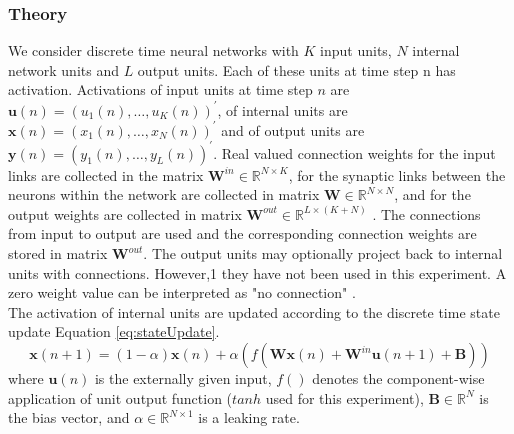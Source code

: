 	\subsubsection{Theory}
  We consider discrete time neural networks with $K$ input units, $N$ internal network units and $L$ output units. Each of these units at time step n has activation. Activations of input units at time step $n$ are $\mathbf{u}(n) = (u_1(n),\hdots,u_K(n))^{'}$, of internal units are $\mathbf{x}(n) =( x_1(n),\hdots,x_N(n) )^{'}$ and of output units are $\mathbf{y}(n) = (y_1(n),\hdots,y_L(n))^{'}$. Real valued connection weights for the input links are collected in the matrix $\mathbf{W}^{in} \in \mathbb{R}^{N \times K }$, for the synaptic links between the neurons within the network are collected in matrix $\mathbf{W} \in \mathbb{R}^{N \times N }$, and for the output weights are collected in matrix $\mathbf{W}^{out} \in \mathbb{R}^{L \times (K+N) }$ \cite{EchoStatesTechRep}. The connections from input to output are used and the corresponding connection weights are stored in matrix $\mathbf{W}^{out}$. The output units may optionally project back to internal units with connections. However,1 they have not been used in this experiment. A zero weight value can be interpreted as "no connection" \cite{Jaeger_TrainingRNNsTutorial.2005}. \\
  \indent \indent
  The activation of internal units are updated according to the discrete time state update Equation \eqref{eq:stateUpdate}.
   \begin{equation} \label{eq:stateUpdate}
    \mathbf{x}(n+1) = (1-\alpha)\mathbf{x}(n) + \alpha ( f(\mathbf{Wx}(n) +  \mathbf{W}^{in}\mathbf{u}(n+1) + \mathbf{B} ) )
  \end{equation}
   where $\mathbf{u}(n)$ is the externally given input, $f()$ denotes the component-wise application of unit output function ($tanh$ used for this experiment), $\mathbf{B} \in \mathbb{R}^N$ is the bias vector, and $\alpha \in \mathbb{R}^{N\times1}$ is a leaking rate.
   
